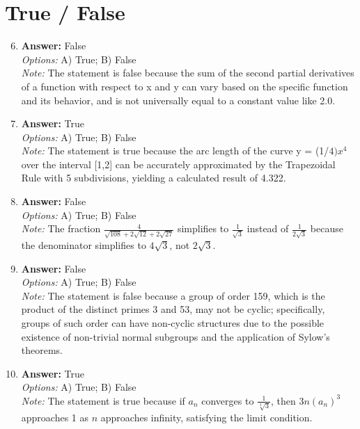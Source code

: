 \documentclass[12pt]{article}
\begin{document}
\section*{True / False}
\begin{enumerate}[label=\arabic*.]
\setcounter{enumi}{5}
\item \textbf{Answer:} False
\\ \textit{Options:} A) True; B) False
\\ \textit{Note:} The statement is false because the sum of the second partial derivatives of a function with respect to x and y can vary based on the specific function and its behavior, and is not universally equal to a constant value like 2.0.
\item \textbf{Answer:} True
\\ \textit{Options:} A) True; B) False
\\ \textit{Note:} The statement is true because the arc length of the curve y = (1/$4)x^4$ over the interval [1,2] can be accurately approximated by the Trapezoidal Rule with 5 subdivisions, yielding a calculated result of 4.322.
\item \textbf{Answer:} False
\\ \textit{Options:} A) True; B) False
\\ \textit{Note:} The fraction \( \frac{4}{\sqrt{108}+2\sqrt{12}+2\sqrt{27}} \) simplifies to \( \frac{1}{\sqrt{3}} \) instead of \( \frac{1}{2\sqrt{3}} \) because the denominator simplifies to \( 4\sqrt{3} \), not \( 2\sqrt{3} \).
\item \textbf{Answer:} False
\\ \textit{Options:} A) True; B) False
\\ \textit{Note:} The statement is false because a group of order 159, which is the product of the distinct primes 3 and 53, may not be cyclic; specifically, groups of such order can have non-cyclic structures due to the possible existence of non-trivial normal subgroups and the application of Sylow's theorems.
\item \textbf{Answer:} True
\\ \textit{Options:} A) True; B) False
\\ \textit{Note:} The statement is true because if \( a_n \) converges to \( \frac{1}{\sqrt[3]{3}} \), then \( 3 n(a_n)^3 \) approaches 1 as \( n \) approaches infinity, satisfying the limit condition.
\end{enumerate}
\end{document}
